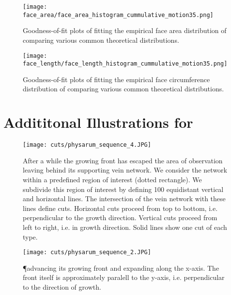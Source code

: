 \begin{figure}[!htbp]
\begin{center}%
  \texttt{[image: face\_area/face\_area\_histogram\_cummulative\_motion35.png]}
\end{center}%
\caption[Goodness-of-fit plots - Face area]{Goodness-of-fit plots of fitting the empirical face area distribution of  comparing various common theoretical distributions.}
\label{fig:sup::face_area_goodness}
\end{figure}

\begin{figure}[!htbp]
\begin{center}%
  \texttt{[image: face\_length/face\_length\_histogram\_cummulative\_motion35.png]}
\end{center}%
\caption[Goodness-of-fit plots - Face circumference]{Goodness-of-fit plots of fitting the empirical face circumference distribution of  comparing various common theoretical distributions.}
\label{fig:sup::face_length_goodness}
\end{figure}

\section{Addititonal Illustrations for }

\vfill
\begin{figure}[!htbp]
\begin{center}%
  \texttt{[image: cuts/physarum\_sequence\_4.JPG]}
\end{center}%
\caption[Horizontal and vertical cuts illustrated]{After a while the growing front has escaped the area of observation leaving behind its supporting vein network. We consider the network within a predefined region of interest (dotted rectangle). We subdivide this region of interest by defining 100 equidistant vertical and horizontal lines. The intersection of the vein network with these lines define cuts. Horizontal cuts proceed from top to bottom, i.e. perpendicular to the growth direction. Vertical cuts proceed from left to right, i.e. in growth direction. Solid lines show one cut of each type.}
\label{fig:sup::physarum_roi}
\end{figure}
\vfill
\begin{figure}[!htbp]
\begin{center}%
  \texttt{[image: cuts/physarum\_sequence\_2.JPG]}
\end{center}%
\caption[Detail of the apical zone]{\P advancing its growing front and expanding along the x-axis. The front itself is approximately paralell to the y-axis, i.e. perpendicular to the direction of growth. }
\label{fig:sup::physarum_expanding}
\end{figure}
\vfill

